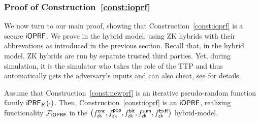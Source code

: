 \subsubsection{Proof of Construction~\ref{const:ioprf}}
\label{mainproof}
We now turn to our main proof, showing that
Construction~\ref{const:ioprf} is a secure $\mathsf{i}\mathsf{OPRF}$. We prove in the
hybrid model, using ZK hybrids with their abbrevations as introduced
in the previous section.  Recall that, in the hybrid model, ZK hybrids
are run by separate trusted third parties. Yet, during simulation, it
is the simulator who takes the role of the TTP and thus automatically
gets the adversary's inputs and can also cheat, see \citet{howto} for
details.

\begin{theorem}
  Assume that Construction~\ref{const:newprf} is an iterative
  pseudo-random function family $\mathsf{i}\mathsf{PRF}_K(\cdot)$.  Then,
  Construction~\ref{const:ioprf} is an $\mathsf{i}\mathsf{OPRF}$, realizing
  functionality $\mathcal{F}_{\mathsf{i}\mathsf{OPRF}}$ in the
  $\left({f^{\mathsf{enc}}_{\mathsf{zk}}},{f^{\mathsf{pop}}_{\mathsf{zk}}},{f^{\mathsf{bit}}_{\mathsf{zk}}},{f^{\mathsf{sum}}_{\mathsf{zk}}},{f^{\mathsf{ExR}}_{\mathsf{zk}}}\right)$
  hybrid-model.
\end{theorem}

